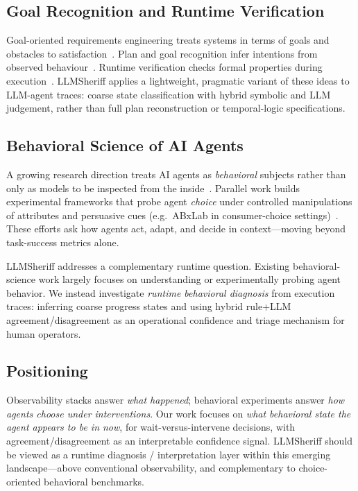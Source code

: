 \documentclass[conference]{IEEEtran}
\begin{document}
\subsection{Goal Recognition and Runtime Verification}

Goal-oriented requirements engineering treats systems in terms of goals and obstacles to
satisfaction~\cite{horkoff2016,dardenne1993}. Plan and goal recognition infer intentions
from observed behaviour~\cite{carberry2001}. Runtime verification checks formal properties
during execution~\cite{leucker2009}. LLMSheriff applies a lightweight, pragmatic variant
of these ideas to LLM-agent traces: coarse state classification with hybrid symbolic and
LLM judgement, rather than full plan reconstruction or temporal-logic specifications.

\subsection{Behavioral Science of AI Agents}

A growing research direction treats AI agents as \emph{behavioral} subjects rather than
only as models to be inspected from the inside~\cite{chen2025agentbehavior}. Parallel
work builds experimental frameworks that probe agent \emph{choice} under controlled
manipulations of attributes and persuasive cues (e.g.\ ABxLab in consumer-choice
settings)~\cite{cherep2026abxlab}. These efforts ask how agents act, adapt, and decide
in context---moving beyond task-success metrics alone.

LLMSheriff addresses a complementary runtime question. Existing behavioral-science work
largely focuses on understanding or experimentally probing agent behavior. We instead
investigate \emph{runtime behavioral diagnosis} from execution traces: inferring coarse
progress states and using hybrid rule+LLM agreement/disagreement as an operational
confidence and triage mechanism for human operators.

\subsection{Positioning}

Observability stacks answer \emph{what happened}; behavioral experiments answer
\emph{how agents choose under interventions}. Our work focuses on \emph{what behavioral
state the agent appears to be in now}, for wait-versus-intervene decisions, with
agreement/disagreement as an interpretable confidence signal. LLMSheriff should be viewed
as a runtime diagnosis / interpretation layer within this emerging landscape---above
conventional observability, and complementary to choice-oriented behavioral benchmarks.
\end{document}
